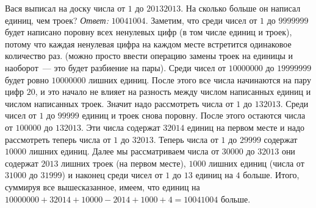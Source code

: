 \problem
Вася выписал на доску числа от $1$ до $20132013$.
На сколько больше он написал единиц, чем троек?
\solution
\emph{Ответ:} $10041004$.
Заметим, что среди чисел от $1$ до $9999999$ будет написано поровну всех
ненулевых цифр (в том числе единиц и троек), потому что каждая ненулевая цифра
на каждом месте встретится одинаковое количество раз.
(можно просто ввести операцию замены троек на единицы и наоборот~--- это будет
разбиение на пары).
Среди чисел от $10000000$ до $19999999$ будет ровно $10000000$ лишних единиц.
После этого все числа начинаются на пару цифр $20$, и это начало не влияет на
разность между числом написанных единиц и числом написанных троек.
Значит надо рассмотреть числа от $1$ до $132013$.
Среди чисел от $1$ до $99999$ единиц и троек снова поровну.
После этого остаются числа от $100000$ до $132013$.
Эти числа содержат $32014$ единиц на первом месте и надо рассмотреть теперь
числа от $1$ до $32013$.
Теперь числа от $1$ до $29999$ содержат $10000$ лишних единиц.
Далее мы рассматриваем числа от $30000$ до $32013$ они содержат $2013$ лишних
троек (на первом месте), $1000$ лишних единиц (числа от $31000$ до $31999$) и
наконец среди чисел от $1$ до $13$ единиц на $4$ больше.
Итого, суммируя все вышесказанное, имеем, что единиц на
$10000000 + 32014 + 10000 - 2014 + 1000 + 4 = 10041004$ больше.
\endproblem

